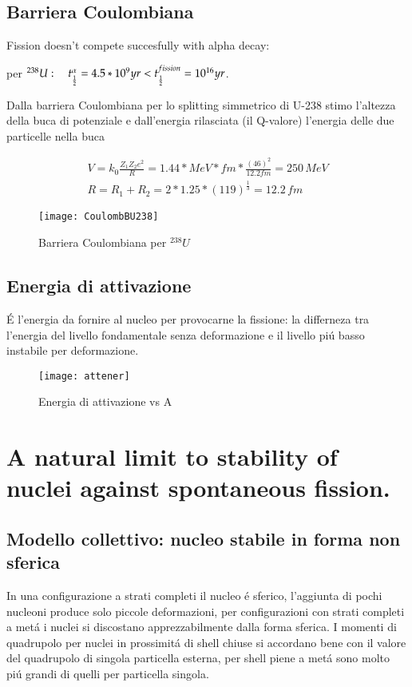 \subsection{Barriera Coulombiana}
Fission doesn't compete succesfully with alpha decay:

per $^{238}U:\quad t_{\frac{1}{2}}^{\alpha}=4.5*10^9 yr<t_{\frac{1}{2}}^{fission}=10^{16} yr$.

Dalla barriera Coulombiana per lo splitting simmetrico di U-238 stimo l'altezza della buca di potenziale e dall'energia rilasciata (il Q-valore) l'energia delle due particelle nella buca

\begin{align*}
V=k_0\frac{Z_1Z_2e^2}{R}=1.44*MeV*fm*\frac{(46)^2}{12.2 fm}=250\, MeV\\
R=R_1+R_2=2*1.25*(119)^{\frac{1}{3}}=12.2\,fm
\end{align*}

\begin{figure}[!ht]
\centering
\texttt{[image: CoulombBU238]}
\caption{Barriera Coulombiana per $^{238}U$}
\end{figure}

\clearpage

\subsection{Energia di attivazione}
\'E l'energia da fornire al nucleo per provocarne la fissione: la differneza tra l'energia del livello fondamentale senza deformazione e il livello pi\'u basso instabile per deformazione.
\begin{figure}[!ht]
\centering
\texttt{[image: attener]}
\caption{Energia di attivazione vs A}
\end{figure}

\clearpage

\section{A natural limit to stability of nuclei against spontaneous fission.}\label{sec:deformednucleus}

\subsection{Modello collettivo: nucleo stabile in forma non sferica}

In una configurazione a strati completi il nucleo \'e sferico, l'aggiunta di pochi nucleoni produce solo piccole deformazioni, per configurazioni con strati completi a met\'a i nuclei si discostano apprezzabilmente dalla forma sferica. I momenti di quadrupolo per nuclei in prossimit\'a di shell chiuse si accordano bene con il valore del quadrupolo di singola particella esterna, per shell piene a met\'a sono molto pi\'u grandi di quelli per particella singola.

